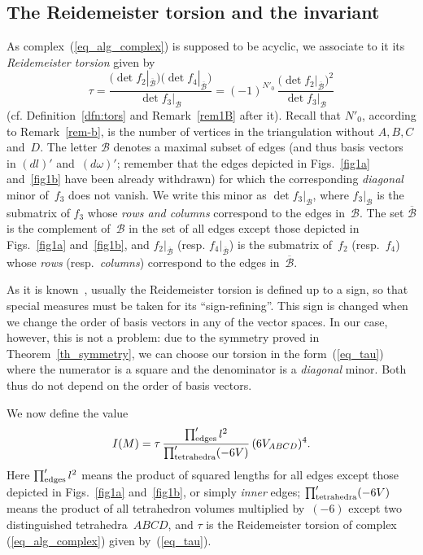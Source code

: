 \subsection{The Reidemeister torsion and the invariant}
\label{subsec-torsion-invariant}

As complex~(\ref{eq_alg_complex}) is supposed to be acyclic, we associate to it its \emph{Reidemeister torsion} given by
\begin{equation}
\tau = \frac{\bigl(\det f_2 |_{\overline{\mathcal B}}\bigr) \bigl(\det f_4 |_{\overline{\mathcal B}}\bigr)}{\det f_3 |_{\mathcal B}} = (-1)^{N'_0}\, \frac{\bigl(\det f_2 |_{\overline{\mathcal B}}\bigr)^2}{\det f_3 |_{\mathcal B}}
\label{eq_tau}
\end{equation}
(cf. Def\/inition~\ref{dfn:tors} and Remark~\ref{rem1B} after it). Recall that $N'_0$, according to Remark~\ref{rem-b}, is the number of vertices in the triangulation without $A,B,C$ and~$D$. The letter $\mathcal B$ denotes a maximal subset of edges (and thus basis vectors in $(dl)'$ and~$(d\omega)'$; remember that the edges depicted in Figs.~\ref{fig1a} and~\ref{fig1b} have been already withdrawn) for which the corresponding \emph{ diagonal} minor of~$f_3$ does not vanish. We write this minor as $\det f_3|_{\mathcal B}$, where $f_3|_{\mathcal B}$ is the submatrix of $f_3$ whose \emph{rows and columns} correspond to the edges in~$\mathcal B$. The set $\overline{\mathcal B}$ is the complement of~$\mathcal B$ in the set of all edges except those depicted in Figs.~\ref{fig1a} and~\ref{fig1b}, and $f_2|_{\overline{\mathcal B}}$ (resp. $f_4|_{\overline{\mathcal B}}$) is the submatrix of~$f_2$ (resp.~$f_4$) whose \emph{rows} (resp.\ \emph{columns}) correspond to the edges in~$\overline{\mathcal B}$.

\begin{remark}
\label{remark_sign}
As it is known~\cite{Turaev:2001}, usually the Reidemeister torsion is def\/ined up to a sign, so that special measures must be taken for its ``sign-ref\/ining''. This sign is changed when we change the order of basis vectors in any of the vector spaces. In our case, however, this is not a problem: due to the symmetry proved in Theorem~\ref{th_symmetry}, we can choose our torsion in the form~(\ref{eq_tau}) where the numerator is a square and the denominator is a \emph{diagonal} minor. Both thus do not depend on the order of basis vectors.
\end{remark}

We now def\/ine the value
\begin{equation}
I(M) = \tau\, \frac{\prod_{\rm edges}' l^2}{\prod_{\rm tetrahedra}' (-6V)}\, (6V_{ABCD})^4.
\label{eq_invariant}
\end{equation}
Here $\prod_{\rm edges}' l^2$ means the product of squared lengths for all edges except those depicted in Figs.~\ref{fig1a} and~\ref{fig1b}, or simply \emph{inner} edges; $\prod_{\rm tetrahedra}' (-6V)$ means the product of all tetrahedron volumes multiplied by~$(-6)$ except two distinguished tetrahedra~$ABCD$, and $\tau$ is the Reidemeister torsion of complex (\ref{eq_alg_complex}) given by~(\ref{eq_tau}).

